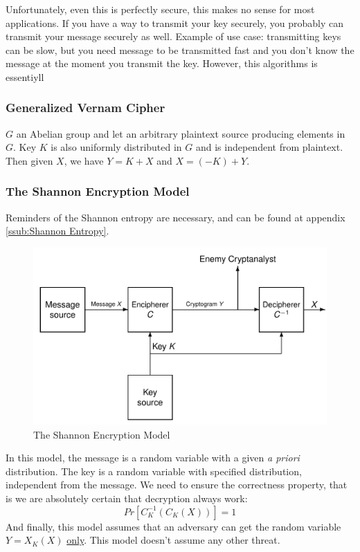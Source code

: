 \documentclass[11pt,a4paper]{article}
\begin{document}
Unfortunately, even this is perfectly secure, this makes no sense for most applications. If you have a way to transmit your key securely, you probably can transmit your message securely as well. Example of use case: transmitting keys can be slow, but you need message to be transmitted fast and you don't know the message at the moment you transmit the key. However, this algorithms is essentiyll

\subsubsection{Generalized Vernam Cipher}
$G$ an Abelian group and let an arbitrary plaintext source producing elements in $G$. Key $K$ is also uniformly distributed in $G$ and is independent from plaintext. Then given $X$, we have $Y = K + X$ and $X = (-K) + Y$.


\subsubsection{The Shannon Encryption Model}
Reminders of the Shannon entropy are necessary, and can be found at appendix \ref{ssub:Shannon Entropy}.

\begin{figure}
    \centering
    \includegraphics[scale=0.3]{images/shannon_model}
    \caption{The Shannon Encryption Model}
    \label{fig:Shannon Encryption Model}
\end{figure}
In this model, the message is a random variable with a given \textit{a priori} distribution. The key is a random variable with specified distribution, independent from the message. We need to ensure the correctness property, that is we are absolutely certain that decryption always work:
\[Pr[C_K^{-1}(C_K(X))] = 1\]
And finally, this model assumes that an adversary can get the random variable $Y  =X_K(X)$ \uline{only}. This model doesn't assume any other threat.
\end{document}
